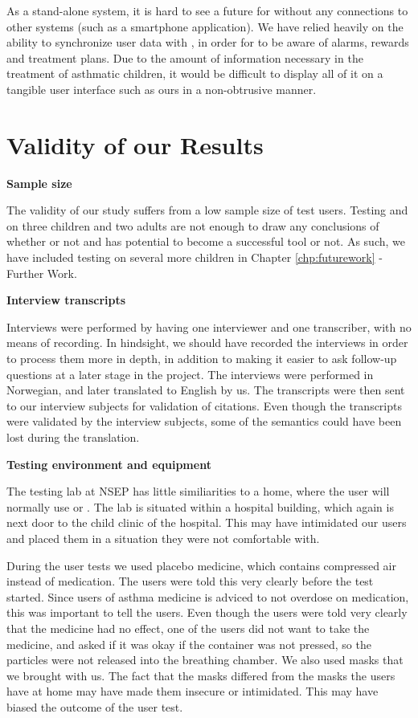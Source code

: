 As a stand-alone system, it is hard to see a future for \ab{} without any connections to other systems (such as a smartphone application). We have relied heavily on the ability to synchronize user data with \app{}, in order for \ab{} to be aware of alarms, rewards and treatment plans. Due to the amount of information necessary in the treatment of asthmatic children, it would be difficult to display all of it on a tangible user interface such as ours in a non-obtrusive manner.  


\section{Validity of our Results}
\label{sec:validity}

\textbf{Sample size}

The validity of our study suffers from a low sample size of test users. Testing \ab{} and \app{} on three children and two adults are not enough to draw any conclusions of whether or not \app{} and \ab{} has potential to become a successful tool or not. As such, we have included testing on several more children in Chapter \ref{chp:futurework} - Further Work.    

\textbf{Interview transcripts}

Interviews were performed by having one interviewer and one transcriber, with no means of recording. In hindsight, we should have recorded the interviews in order to process them more in depth, in addition to making it easier to ask follow-up questions at a later stage in the project. The interviews were performed in Norwegian, and later translated to English by us. The transcripts were then sent to our interview subjects for validation of citations. Even though the transcripts were validated by the interview subjects, some of the semantics could have been lost during the translation. 


\textbf{Testing environment and equipment}

The testing lab at NSEP has little similiarities to a home, where the user will normally use \ab{} or \app{}. The lab is situated within a hospital building, which again is next door to the child clinic of the hospital. This may have intimidated our users and placed them in a situation they were not comfortable with. 

During the user tests we used placebo medicine, which contains compressed air instead of medication. The users were told this very clearly before the test started. Since users of asthma medicine is adviced to not overdose on medication, this was important to tell the users. Even though the users were told very clearly that the medicine had no effect, one of the users did not want to take the medicine, and asked if it was okay if the container was not pressed, so the particles were not released into the breathing chamber. 
We also used masks that we brought with us. The fact that the masks differed from the masks the users have at home may have made them insecure or intimidated. This may have biased the outcome of the user test. 


